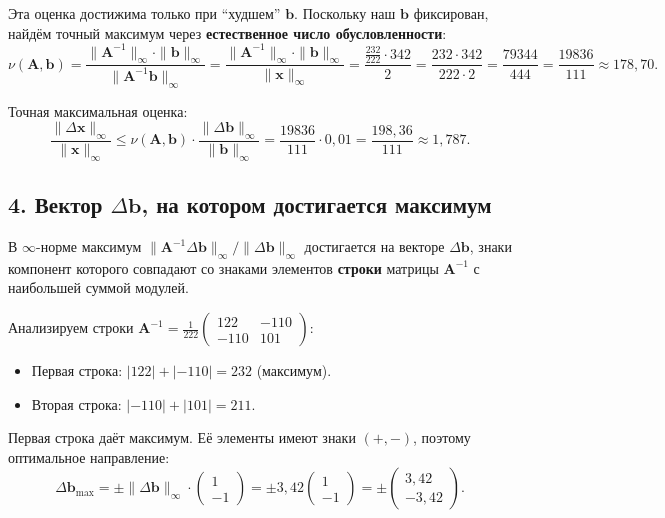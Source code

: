 \documentclass{article}
\begin{document}
Эта оценка достижима только при ``худшем'' $\mathbf{b}$. Поскольку наш $\mathbf{b}$ фиксирован, найдём точный максимум через \textbf{естественное число обусловленности}:
\begin{equation}
\nu(\mathbf{A}, \mathbf{b}) = \frac{\|\mathbf{A}^{-1}\|_\infty \cdot \|\mathbf{b}\|_\infty}{\|\mathbf{A}^{-1}\mathbf{b}\|_\infty} = \frac{\|\mathbf{A}^{-1}\|_\infty \cdot \|\mathbf{b}\|_\infty}{\|\mathbf{x}\|_\infty} = \frac{\frac{232}{222} \cdot 342}{2} = \frac{232 \cdot 342}{222 \cdot 2} = \frac{79344}{444} = \frac{19836}{111} \approx 178{,}70.
\end{equation}

Точная максимальная оценка:
\begin{equation}
\frac{\|\Delta\mathbf{x}\|_\infty}{\|\mathbf{x}\|_\infty} \leqslant \nu(\mathbf{A}, \mathbf{b}) \cdot \frac{\|\Delta\mathbf{b}\|_\infty}{\|\mathbf{b}\|_\infty} = \frac{19836}{111} \cdot 0{,}01 = \frac{198{,}36}{111} \approx 1{,}787.
\end{equation}

\subsection*{4. Вектор $\Delta\mathbf{b}$, на котором достигается максимум}

В $\infty$-норме максимум $\|\mathbf{A}^{-1}\Delta\mathbf{b}\|_\infty / \|\Delta\mathbf{b}\|_\infty$ достигается на векторе $\Delta\mathbf{b}$, знаки компонент которого совпадают со знаками элементов \textbf{строки} матрицы $\mathbf{A}^{-1}$ с наибольшей суммой модулей.

Анализируем строки $\mathbf{A}^{-1} = \frac{1}{222}\begin{pmatrix} 122 & -110 \\ -110 & 101 \end{pmatrix}$:
\begin{itemize}
    \item Первая строка: $|122| + |-110| = 232$ (максимум).
    \item Вторая строка: $|-110| + |101| = 211$.
\end{itemize}

Первая строка даёт максимум. Её элементы имеют знаки $(+, -)$, поэтому оптимальное направление:
\begin{equation}
\Delta\mathbf{b}_{\max} = \pm \|\Delta\mathbf{b}\|_\infty \cdot \begin{pmatrix} 1 \\ -1 \end{pmatrix} = \pm 3{,}42 \begin{pmatrix} 1 \\ -1 \end{pmatrix} = \pm \begin{pmatrix} 3{,}42 \\ -3{,}42 \end{pmatrix}.
\end{equation}
\end{document}
